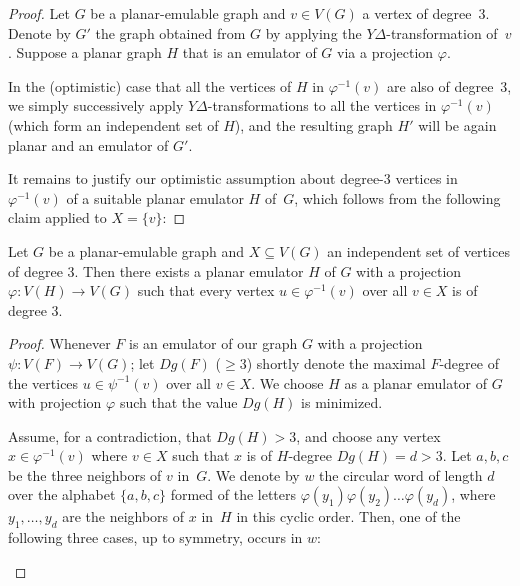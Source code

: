 \documentclass[envcountsect,envcountsame]{llncs}
\renewenvironment{accumulate}{}{}
\begin{document}
\begin{accumulate}
\begin{proof}
Let $G$ be a planar-emulable graph and $v\in V(G)$ a vertex of degree~$3$.
Denote by $G'$ the graph obtained from $G$ by applying the
$Y\!\Delta$-transformation of~$v$.
Suppose a planar graph $H$ that is an emulator of $G$ via a projection $\varphi$.

In the (optimistic) case that all the vertices of $H$ in $\varphi^{-1}(v)$
are also of degree~$3$,
we simply successively apply $Y\!\Delta$-transformations to all the vertices in
$\varphi^{-1}(v)$ (which form an independent set of $H$),
and the resulting graph $H'$ will be again planar and an emulator of $G'$.

It remains to justify our optimistic assumption about degree-$3$ vertices in
$\varphi^{-1}(v)$ of a suitable planar emulator $H$ of~$G$, which
follows from the following claim applied to $X=\{v\}$:
\end{proof}

\begin{lemma}\label{lem:cubic_vert}
Let $G$ be a planar-emulable graph
and $X \subseteq V(G)$ an independent set of vertices of degree 3. 
Then there exists a planar emulator $H$ of $G$ with a projection 
$\varphi : V(H) \rightarrow V(G)$ such that every vertex 
$u \in \varphi^{-1}(v)$ over all $v \in X$ is of degree 3. 
\end{lemma}

\begin{proof}
Whenever $F$ is an emulator of our graph $G$ with a projection $\psi: V(F)\rightarrow V(G)$;
let $Dg(F)$ ($\geq3$) shortly denote the maximal $F$-degree of the vertices 
$u \in {\psi}^{-1}(v)$ over all $v \in X$. 
We choose $H$ as a planar emulator of $G$ with projection $\varphi$ such
that the value $Dg(H)$ is minimized.

Assume, for a contradiction, that $Dg(H)>3$, and choose any vertex
$x \in \varphi^{-1}(v)$ where $v \in X$ such that $x$ is of $H$-degree $Dg(H)=d>3$.
Let $a,b,c$ be the three neighbors of $v$ in~$G$.
We denote by $w$ the circular word of length $d$ over the alphabet
$\{a,b,c\}$ formed of the letters
$\varphi(y_1)\varphi(y_2)\dots\varphi(y_d)$, where $y_1,\dots,y_d$ are the
neighbors of $x$ in~$H$ in this cyclic order.
Then, one of the following three cases, up to symmetry, occurs in $w$:

\begin{figure}[t]
  \centering
  \def \svgwidth{\columnwidth}
  


\end{figure}
\end{proof}
\end{accumulate}
\end{document}
